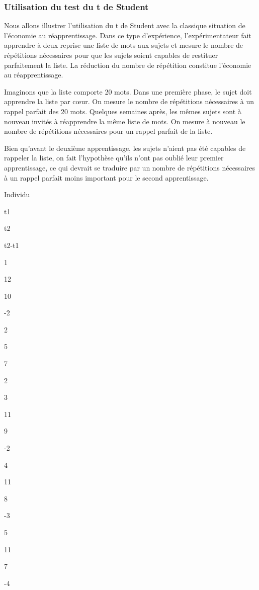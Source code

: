 \documentclass[]{book}
\theoremstyle{definition}
\theoremstyle{definition}
\theoremstyle{definition}
\theoremstyle{remark}
\begin{document}
\hypertarget{utilisation-du-test-du-t-de-student}{%
\subsubsection{Utilisation du test du t de
Student}\label{utilisation-du-test-du-t-de-student}}

Nous allons illustrer l'utilisation du t de Student avec la classique
situation de l'économie au réapprentissage. Dans ce type d'expérience,
l'expérimentateur fait apprendre à deux reprise une liste de mots aux
sujets et mesure le nombre de répétitions nécessaires pour que les
sujets soient capables de restituer parfaitement la liste. La réduction
du nombre de répétition constitue l'économie au réapprentissage.

Imaginons que la liste comporte 20 mots. Dans une première phase, le
sujet doit apprendre la liste par cœur. On mesure le nombre de
répétitions nécessaires à un rappel parfait des 20 mots. Quelques
semaines après, les mêmes sujets sont à nouveau invités à réapprendre la
même liste de mots. On mesure à nouveau le nombre de répétitions
nécessaires pour un rappel parfait de la liste.

Bien qu'avant le deuxième apprentissage, les sujets n'aient pas été
capables de rappeler la liste, on fait l'hypothèse qu'ils n'ont pas
oublié leur premier apprentissage, ce qui devrait se traduire par un
nombre de répétitions nécessaires à un rappel parfait moins important
pour le second apprentissage.

Individu

t1

t2

t2-t1

1

12

10

-2

2

5

7

2

3

11

9

-2

4

11

8

-3

5

11

7

-4
\end{document}
